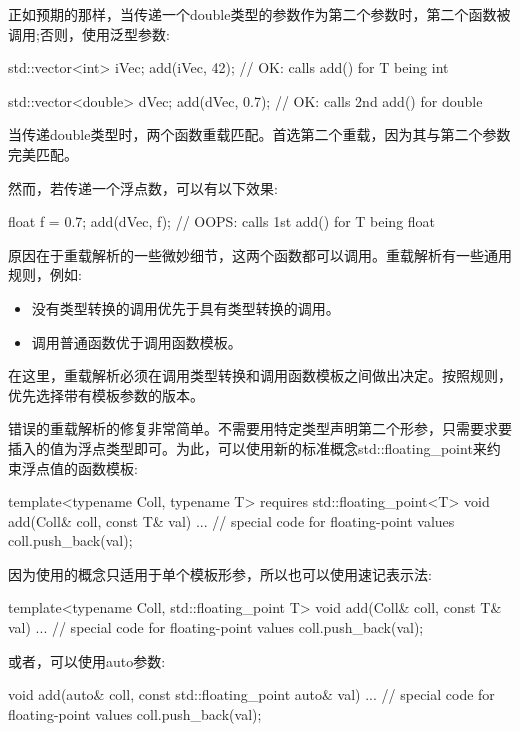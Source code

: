 正如预期的那样，当传递一个double类型的参数作为第二个参数时，第二个函数被调用;否则，使用泛型参数:

\begin{cpp}
std::vector<int> iVec;
add(iVec, 42); // OK: calls add() for T being int

std::vector<double> dVec;
add(dVec, 0.7); // OK: calls 2nd add() for double
\end{cpp}

当传递double类型时，两个函数重载匹配。首选第二个重载，因为其与第二个参数完美匹配。

然而，若传递一个浮点数，可以有以下效果:

\begin{cpp}
float f = 0.7;
add(dVec, f); // OOPS: calls 1st add() for T being float
\end{cpp}

原因在于重载解析的一些微妙细节，这两个函数都可以调用。重载解析有一些通用规则，例如:

\begin{itemize}
\item
没有类型转换的调用优先于具有类型转换的调用。

\item
调用普通函数优于调用函数模板。
\end{itemize}

在这里，重载解析必须在调用类型转换和调用函数模板之间做出决定。按照规则，优先选择带有模板参数的版本。


错误的重载解析的修复非常简单。不需要用特定类型声明第二个形参，只需要求要插入的值为浮点类型即可。为此，可以使用新的标准概念std::floating\_point来约束浮点值的函数模板:

\begin{cpp}
template<typename Coll, typename T>
requires std::floating_point<T>
void add(Coll& coll, const T& val)
{
	... // special code for floating-point values
	coll.push_back(val);
}
\end{cpp}

因为使用的概念只适用于单个模板形参，所以也可以使用速记表示法:

\begin{cpp}
template<typename Coll, std::floating_point T>
void add(Coll& coll, const T& val)
{
	... // special code for floating-point values
	coll.push_back(val);
}
\end{cpp}

或者，可以使用auto参数:

\begin{cpp}
void add(auto& coll, const std::floating_point auto& val)
{
	... // special code for floating-point values
	coll.push_back(val);
}
\end{cpp}

